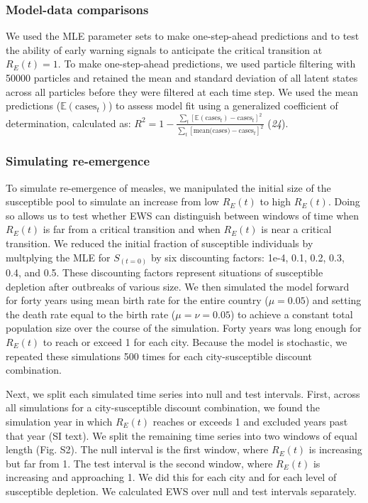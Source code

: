 \documentclass[3p]{elsarticle} %
\begin{document}
\subsubsection{Model-data comparisons}\label{model-data-comparisons}

We used the MLE parameter sets to make one-step-ahead predictions and to
test the ability of early warning signals to anticipate the critical
transition at \(R_E(t) = 1\). To make one-step-ahead predictions, we
used particle filtering with 50000 particles and retained the mean and
standard deviation of all latent states across all particles before they
were filtered at each time step. We used the mean predictions
(\(\mathbb{E}(\text{cases}_t)\)) to assess model fit using a generalized
coefficient of determination, calculated as:
\(R^2 = 1 - \frac{\sum_t [\mathbb{E}(\text{cases}_t) - \text{cases}_t]^2}{\sum_t [\text{mean(cases)}-\text{cases}_t]^2}\)
(\emph{24}).

\subsubsection{Simulating re-emergence}\label{simulating-re-emergence}

To simulate re-emergence of measles, we manipulated the initial size of
the susceptible pool to simulate an increase from low \(R_E(t)\) to high
\(R_E(t)\). Doing so allows us to test whether EWS can distinguish
between windows of time when \(R_E(t)\) is far from a critical
transition and when \(R_E(t)\) is near a critical transition. We reduced
the initial fraction of susceptible individuals by multplying the MLE
for \(S_{(t=0)}\) by six discounting factors: 1e-4, 0.1, 0.2, 0.3, 0.4,
and 0.5. These discounting factors represent situations of susceptible
depletion after outbreaks of various size. We then simulated the model
forward for forty years using mean birth rate for the entire country
(\(\mu = 0.05\)) and setting the death rate equal to the birth rate
(\(\mu = \nu = 0.05\)) to achieve a constant total population size over
the course of the simulation. Forty years was long enough for \(R_E(t)\)
to reach or exceed 1 for each city. Because the model is stochastic, we
repeated these simulations 500 times for each city-susceptible discount
combination.

Next, we split each simulated time series into null and test intervals.
First, across all simulations for a city-susceptible discount
combination, we found the simulation year in which \(R_E(t)\) reaches or
exceeds 1 and excluded years past that year (SI text). We split the
remaining time series into two windows of equal length (Fig. S2). The
null interval is the first window, where \(R_E(t)\) is increasing but
far from 1. The test interval is the second window, where \(R_E(t)\) is
increasing and approaching 1. We did this for each city and for each
level of susceptible depletion. We calculated EWS over null and test
intervals separately.
\end{document}
